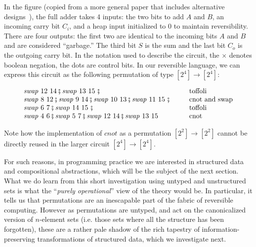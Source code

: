 \documentclass{article}
\begin{document}
In the figure (copied from a more general paper that includes
alternative designs~\cite{Rentergem2005OptimalDO}), the full adder
takes 4 inputs: the two bits to add $A$ and $B$, an incoming carry bit
$C_i$, and a heap input initialized to 0 to maintain
reversibility. There are four outputs: the first two are identical to
the incoming bits $A$ and $B$ and are considered ``garbage.'' The
third bit $S$ is the sum and the last bit $C_o$ is the outgoing carry
bit. In the notation used to describe the circuit, the $\times$ denotes
boolean negation, the dots are control bits. In our reversible
language, we can express this circuit as the following permutation of
type $[2^4] \rightarrow [2^4]$:

\begin{equation}\label{eq:adder}
\begin{array}{l@{\hspace{1cm}}l}
\mathit{swap}~12~14 \fatsemi \mathit{swap}~13~15 ~\fatsemi & \mbox{toffoli} \\
\mathit{swap}~8~12 \fatsemi \mathit{swap}~9~14 \fatsemi 
    \mathit{swap}~10~13 \fatsemi \mathit{swap}~11~15 ~\fatsemi & \mbox{cnot and swap} \\
\mathit{swap}~6~7 \fatsemi \mathit{swap}~14~15 ~\fatsemi & \mbox{toffoli} \\
\mathit{swap}~4~6 \fatsemi \mathit{swap}~5~7 \fatsemi
    \mathit{swap}~12~14 \fatsemi \mathit{swap}~13~15 & \mbox{cnot}
\end{array}
\end{equation}

Note how the implementation of $\mathit{cnot}$ as a permutation
$[2^2] \rightarrow [2^2]$ cannot be directly reused in the larger
circuit $[2^4] \rightarrow [2^4]$. 

For such reasons, in programming practice we are interested in
structured data and compositional abstractions, which will be the
subject of the next section. What we do learn from this short investigation
using untyped and unstructured sets is what the ``\emph{purely
  operational}'' view of the theory would be. In particular, it tells
us that permutations are an inescapable part of the fabric of
reversible computing.  However as permutations are untyped, and act on
the canonicalized version of $n$-element sets (i.e. those sets where
all the structure has been forgotten), these are a rather pale shadow
of the rich tapestry of information-preserving transformations of
structured data, which we investigate next.

\end{document}
